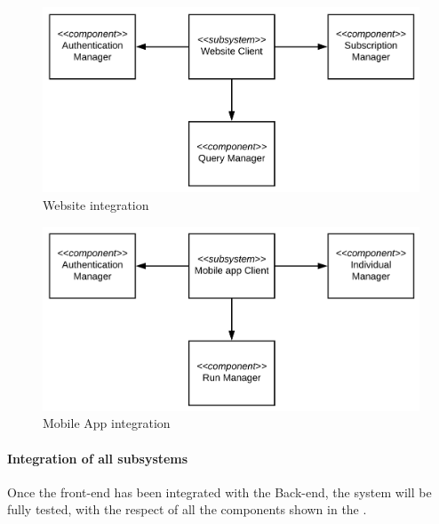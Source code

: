 \begin{figure}[H]
	\includegraphics[width=\textwidth,height=\textheight,keepaspectratio]{assets/integration/IntegrationWebsite.pdf}
	\caption{Website integration}
	\label{fig:IntegrationWebsite}
\end{figure}

\begin{figure}[H]
	\includegraphics[width=\textwidth,height=\textheight,keepaspectratio]{assets/integration/IntegrationMobileApp.pdf}
	\caption{Mobile App integration}
	\label{fig:IntegrationMobileApp}
\end{figure}


\paragraph{Integration of all subsystems}
Once the front-end has been integrated with the Back-end, the system will be fully tested, with the respect of all the components shown in the .

